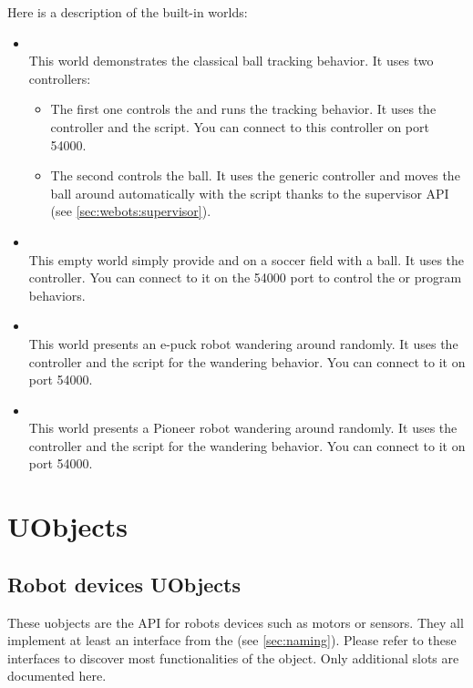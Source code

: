 Here is a description of the built-in worlds:

\begin{itemize}
\item {}\\
  This world demonstrates the \urbi classical \aibo ball tracking
  behavior. It uses two \urbi controllers:
  \begin{itemize}
  \item The first one controls the \aibo and runs the tracking
    behavior. It uses the  controller and the
     script. You can connect to this
    controller on port 54000.
  \item The second controls the ball. It uses the generic
     controller and moves the ball around automatically
    with the  script thanks to the supervisor
    API (see \autoref{sec:webots:supervisor}).
  \end{itemize}
\item {}\\
  This empty world simply provide and \aibo on a soccer field with a
  ball. It uses the  controller. You can connect to it on
  the 54000 port to control the \aibo or program behaviors.
\item {}\\
  This world presents an e-puck robot wandering around randomly. It
  uses the  controller and the 
  script for the wandering behavior. You can connect to it on port
  54000.
\item {}\\
  This world presents a Pioneer robot wandering around randomly. It
  uses the  controller and the 
  script for the wandering behavior. You can connect to it on port
  54000.
\end{itemize}

\section{\webots UObjects}

\subsection{Robot devices UObjects}

These uobjects are the \urbi API for \webots robots devices such as
motors or sensors. They all implement at least an interface from the
\gsrapi (see \autoref{sec:naming}). Please refer to these interfaces
to discover most functionalities of the object. Only additional slots
are documented here.

